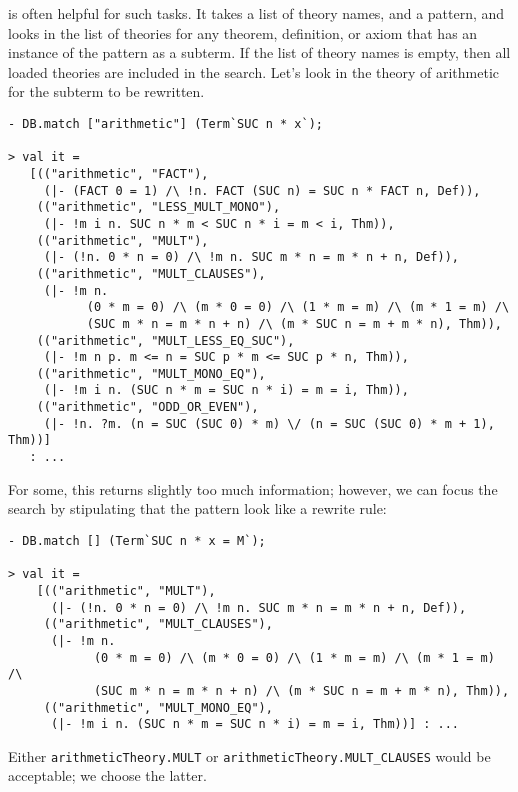\noindent
is often helpful for such tasks. It takes a list of theory names, and
a pattern, and looks in the list of theories for any theorem,
definition, or axiom that has an instance of the pattern as a subterm.
If the list of theory names is empty, then all loaded theories are
included in the search. Let's look in the theory of arithmetic for the
subterm to be rewritten.

\begin{session}\begin{verbatim}
- DB.match ["arithmetic"] (Term`SUC n * x`);

> val it =
   [(("arithmetic", "FACT"),
     (|- (FACT 0 = 1) /\ !n. FACT (SUC n) = SUC n * FACT n, Def)),
    (("arithmetic", "LESS_MULT_MONO"),
     (|- !m i n. SUC n * m < SUC n * i = m < i, Thm)),
    (("arithmetic", "MULT"),
     (|- (!n. 0 * n = 0) /\ !m n. SUC m * n = m * n + n, Def)),
    (("arithmetic", "MULT_CLAUSES"),
     (|- !m n.
           (0 * m = 0) /\ (m * 0 = 0) /\ (1 * m = m) /\ (m * 1 = m) /\
           (SUC m * n = m * n + n) /\ (m * SUC n = m + m * n), Thm)),
    (("arithmetic", "MULT_LESS_EQ_SUC"),
     (|- !m n p. m <= n = SUC p * m <= SUC p * n, Thm)),
    (("arithmetic", "MULT_MONO_EQ"),
     (|- !m i n. (SUC n * m = SUC n * i) = m = i, Thm)),
    (("arithmetic", "ODD_OR_EVEN"),
     (|- !n. ?m. (n = SUC (SUC 0) * m) \/ (n = SUC (SUC 0) * m + 1), Thm))]
   : ...
\end{verbatim}\end{session}

For some, this returns slightly too much information; however, we can
focus the search by stipulating that the pattern look like a rewrite
rule:

\begin{session}\begin{verbatim}
- DB.match [] (Term`SUC n * x = M`);

> val it =
    [(("arithmetic", "MULT"),
      (|- (!n. 0 * n = 0) /\ !m n. SUC m * n = m * n + n, Def)),
     (("arithmetic", "MULT_CLAUSES"),
      (|- !m n.
            (0 * m = 0) /\ (m * 0 = 0) /\ (1 * m = m) /\ (m * 1 = m) /\
            (SUC m * n = m * n + n) /\ (m * SUC n = m + m * n), Thm)),
     (("arithmetic", "MULT_MONO_EQ"),
      (|- !m i n. (SUC n * m = SUC n * i) = m = i, Thm))] : ...
\end{verbatim}\end{session}

Either {\small\verb+arithmeticTheory.MULT+} or
{\small\verb+arithmeticTheory.MULT_CLAUSES+} would be acceptable; we
choose the latter.

